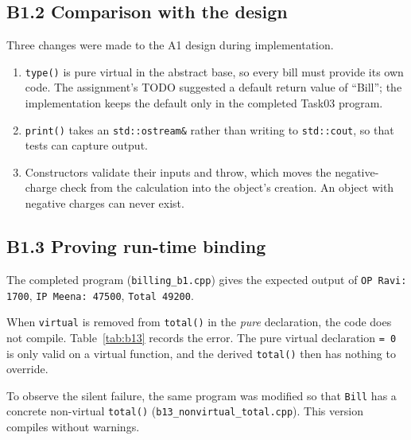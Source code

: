 \documentclass[11pt,a4paper]{article}
\newcommand{\lstout}[2]{}
\begin{document}
\lstout{../Task06_Extension_Final/billing_tests.out}{Full output of the test driver (B1.1, error paths, batch, B4.2 scope guards)}

\subsection*{B1.2 Comparison with the design}
Three changes were made to the A1 design during implementation.
\begin{enumerate}[nosep]
\item \texttt{type()} is pure virtual in the abstract base, so every bill must provide its own code. The assignment's TODO suggested a default return value of ``Bill''; the implementation keeps the default only in the completed Task03 program.
\item \texttt{print()} takes an \texttt{std::ostream\&} rather than writing to \texttt{std::cout}, so that tests can capture output.
\item Constructors validate their inputs and throw, which moves the negative-charge check from the calculation into the object's creation. An object with negative charges can never exist.
\end{enumerate}

\subsection*{B1.3 Proving run-time binding}
The completed program (\texttt{billing\_b1.cpp}) gives the expected output of \texttt{OP Ravi: 1700}, \texttt{IP Meena: 47500}, \texttt{Total 49200}.

\lstout{../Task03_Billing_CompleteCode/billing_b1.out}{Output of the completed B1 program (matches the expected output)}

When \texttt{virtual} is removed from \texttt{total()} in the \emph{pure} declaration, the code does not compile. Table~\ref{tab:b13} records the error. The pure virtual declaration \texttt{= 0} is only valid on a virtual function, and the derived \texttt{total()} then has nothing to override.

\lstout{../Task03_Billing_CompleteCode/compile_error_remove_virtual.txt}{Compiler error after removing virtual from the pure declaration of total()}

To observe the silent failure, the same program was modified so that \texttt{Bill} has a concrete non-virtual \texttt{total()} (\texttt{b13\_nonvirtual\_total.cpp}). This version compiles without warnings.
\end{document}
